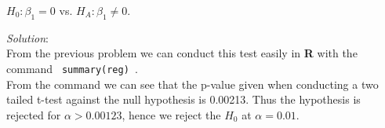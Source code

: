 \documentclass[12pt]{article}
\newcommand{\XB}{\color{black}}
\newcommand{\XBB}{\color{blue}}
\begin{document}
\begin{center}
    $ H_{0} : \beta_{1} = 0 $ vs. $ H_{A} : \beta_{1} \ne 0 $. \\
\end{center}

\XBB\hrulefill\XB
\vspace{5mm}

\vspace{2.5mm}
\textit{Solution}:
\vspace{2.5mm} \\

\noindent
From the previous problem we can conduct this test easily in \textbf{R} with the command {\XBB \texttt{ summary(reg) }}. \\

\noindent
From the command we can see that the p-value given when conducting a two tailed t-test against the null hypothesis is 0.00213.
Thus the hypothesis is rejected for $ \alpha > 0.00123 $, hence we reject the $ H_{0} $ at $ \alpha = 0.01 $.

\vspace{2.5mm}
\end{document}
